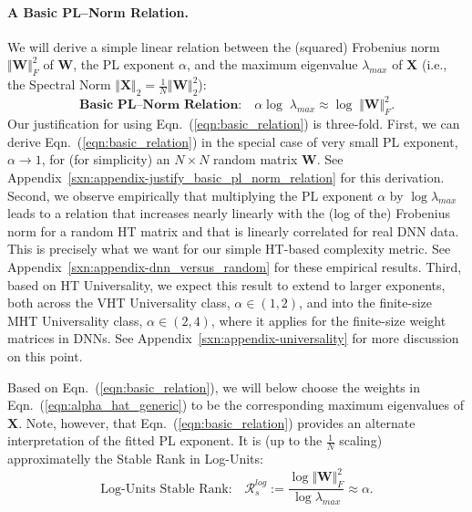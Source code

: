 \paragraph{A Basic PL--Norm Relation.} 

We will derive a simple linear relation between the (squared) Frobenius norm $\Vert\mathbf{W}\Vert^{2}_{F}$ of $\mathbf{W}$, the PL exponent $\alpha$, and the maximum eigenvalue $\lambda_{max}$ of $\mathbf{X}$ (i.e., the Spectral Norm $\Vert\mathbf{X}\Vert_{2}=\frac{1}{N}\Vert\mathbf{W}\Vert^{2}_{2}$):  
\begin{equation}
\textbf{Basic PL--Norm Relation:} \quad \alpha\log\;\lambda_{max}\approx\log\;\Vert\mathbf{W}\Vert^{2}_{F}  .
\label{eqn:basic_relation}
\end{equation}
Our justification for using Eqn.~(\ref{eqn:basic_relation}) is three-fold.
First, we can derive Eqn.~(\ref{eqn:basic_relation}) in the special case of very small PL exponent, $\alpha \rightarrow 1$, for (for simplicity) an $N \times N$ random matrix $\mathbf{W}$.
See Appendix~\ref{sxn:appendix-justify_basic_pl_norm_relation} for this derivation.
Second, we observe empirically that multiplying the PL exponent $\alpha$ by $\log\lambda_{max}$ leads to a relation that increases nearly linearly with the (log of the) Frobenius norm for a random HT matrix and that is linearly correlated for real DNN data. 
This is precisely what we want for our simple HT-based complexity metric.
See Appendix~\ref{sxn:appendix-dnn_versus_random} for these empirical results.
Third, based on HT Universality, we expect this result to extend to larger exponents, both across the VHT Universality class, $\alpha\in(1,2)$, and into the finite-size MHT Universality class, $\alpha\in(2,4)$, where it applies for the finite-size weight matrices in DNNs.
See Appendix~\ref{sxn:appendix-universality} for more discussion on this point.



Based on Eqn.~(\ref{eqn:basic_relation}), we will below choose the weights in Eqn.~(\ref{eqn:alpha_hat_generic}) to be the corresponding maximum eigenvalues of $\mathbf{X}$.
Note, however, that Eqn.~(\ref{eqn:basic_relation}) provides an alternate interpretation of the fitted PL exponent.
It is (up to the $\frac{1}{N}$ scaling) approximatelly the Stable Rank in Log-Units:
$$
\mbox{Log-Units Stable Rank:} 
\quad
\mathcal{R}^{log}_{s}:=\dfrac{\log\Vert\mathbf{W}\Vert^{2}_{F}}{\log\lambda_{max}}  \approx \alpha  .
$$



